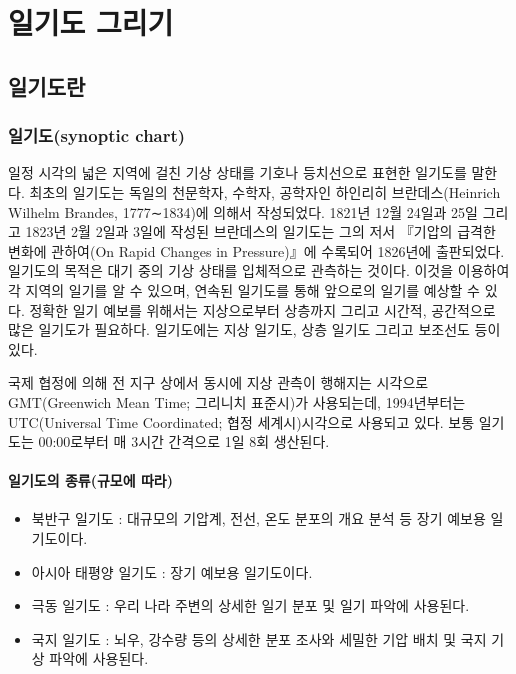 \chapter{일기도 그리기}

\section{일기도란}

\subsection{일기도(synoptic chart)}

일정 시각의 넓은 지역에 걸친 기상 상태를 기호나 등치선으로 표현한 일기도를 말한다. 최초의 일기도는 독일의 천문학자, 수학자, 공학자인 하인리히 브란데스(Heinrich Wilhelm Brandes, 1777∼1834)에 의해서 작성되었다. 1821년 12월 24일과 25일 그리고 1823년 2월 2일과 3일에 작성된 브란데스의 일기도는 그의 저서 『기압의 급격한 변화에 관하여(On Rapid Changes in Pressure)』에 수록되어 1826년에 출판되었다.
일기도의 목적은 대기 중의 기상 상태를 입체적으로 관측하는 것이다. 이것을 이용하여 각 지역의 일기를 알 수 있으며, 연속된 일기도를 통해 앞으로의 일기를 예상할 수 있다. 정확한 일기 예보를 위해서는 지상으로부터 상층까지 그리고 시간적, 공간적으로 많은 일기도가 필요하다. 일기도에는 지상 일기도, 상층 일기도 그리고 보조선도 등이 있다.

국제 협정에 의해 전 지구 상에서 동시에 지상 관측이 행해지는 시각으로 GMT(Greenwich Mean Time; 그리니치 표준시)가 사용되는데, 1994년부터는 UTC(Universal Time Coordinated; 협정 세계시)시각으로 사용되고 있다. 보통 일기도는 00:00로부터 매 3시간 간격으로 1일 8회 생산된다.


\subsubsection{일기도의 종류(규모에 따라)}

\begin{itemize}
	\item 북반구 일기도 : 대규모의 기압계, 전선, 온도 분포의 개요 분석 등 장기 예보용 일기도이다.
	\item 아시아 태평양 일기도 : 장기 예보용 일기도이다.
	\item 극동 일기도 : 우리 나라 주변의 상세한 일기 분포 및 일기 파악에 사용된다.
	\item 국지 일기도 : 뇌우, 강수량 등의 상세한 분포 조사와 세밀한 기압 배치 및 국지 기상 파악에 사용된다.
\end{itemize}

